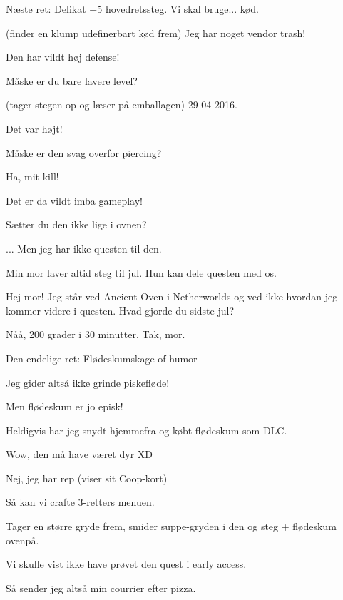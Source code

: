 \documentclass[a4paper,11pt]{article}
\begin{document}
\begin{sketch}
 Næste ret:  Delikat +5 hovedretssteg. Vi skal bruge... kød.

 (finder en klump udefinerbart kød frem) Jeg har noget vendor trash!



 Den har vildt høj defense!

 Måske er du bare lavere level?

 (tager stegen op og læser på emballagen) 29-04-2016.

 Det var højt!


 Måske er den svag overfor piercing?


 Ha, mit kill!

 Det er da vildt imba gameplay!

 Sætter du den ikke lige i ovnen?

 ... Men jeg har ikke questen til den.

 Min mor laver altid steg til jul.  Hun kan dele questen med os.


 Hej mor!  Jeg står ved Ancient Oven i Netherworlds og ved ikke hvordan
jeg kommer videre i questen.  Hvad gjorde du sidste jul?


 Nåå, 200 grader i 30 minutter.  Tak, mor.



 Den endelige ret: Flødeskumskage of humor

 Jeg gider altså ikke grinde piskefløde!

 Men flødeskum er jo episk!

 Heldigvis har jeg snydt hjemmefra og købt flødeskum som DLC.

 Wow, den må have været dyr XD

 Nej, jeg har rep (viser sit Coop-kort)

 Så kan vi crafte 3-retters menuen.

 Tager en større gryde frem, smider suppe-gryden i den og steg + flødeskum ovenpå.



 Vi skulle vist ikke have prøvet den quest i early access.


 Så sender jeg altså min courrier efter pizza.


\end{sketch}
\end{document}
